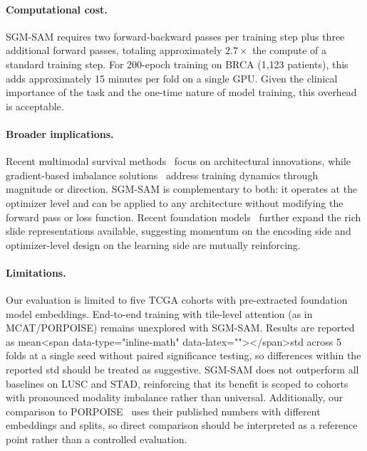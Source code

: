 \documentclass[10pt]{article}\usepackage[utf8]{inputenc}\usepackage[T1]{fontenc}\usepackage{amsmath,amssymb,amsfonts,bm}\usepackage{booktabs}\usepackage{multirow}\usepackage{array}\usepackage{graphicx}\usepackage{algorithm}\usepackage{algorithmic}\usepackage{xcolor}\usepackage[margin=1in]{geometry}\usepackage{microtype}
\begin{document}
\paragraph{Computational cost.} SGM-SAM requires two forward-backward passes per training step plus three additional forward passes, totaling approximately $2.7\times$ the compute of a standard training step. For 200-epoch training on BRCA (1{,}123 patients), this adds approximately 15 minutes per fold on a single GPU. Given the clinical importance of the task and the one-time nature of model training, this overhead is acceptable.

\paragraph{Broader implications.} Recent multimodal survival methods~\cite{jaume2024survpath,xu2023motcat,chen2022porpoise,chen2021mcat} focus on architectural innovations, while gradient-based imbalance solutions~\cite{wu2022greedy,peng2022balanced,fan2023pmr,du2023unimodal,anonymous2026adaptive} address training dynamics through magnitude or direction. SGM-SAM is complementary to both: it operates at the optimizer level and can be applied to any architecture without modifying the forward pass or loss function. Recent foundation models~\cite{chen2024path,vorontsov2024uni,lu2024path} further expand the rich slide representations available, suggesting momentum on the encoding side and optimizer-level design on the learning side are mutually reinforcing.

\paragraph{Limitations.} Our evaluation is limited to five TCGA cohorts with pre-extracted foundation model embeddings. End-to-end training with tile-level attention (as in MCAT/PORPOISE) remains unexplored with SGM-SAM. Results are reported as mean<span data-type="inline-math" data-latex="\pm">\pm</span>std across 5 folds at a single seed without paired significance testing, so differences within the reported std should be treated as suggestive. SGM-SAM does not outperform all baselines on LUSC and STAD, reinforcing that its benefit is scoped to cohorts with pronounced modality imbalance rather than universal. Additionally, our comparison to PORPOISE~\cite{chen2022porpoise} uses their published numbers with different embeddings and splits, so direct comparison should be interpreted as a reference point rather than a controlled evaluation.
\end{document}
